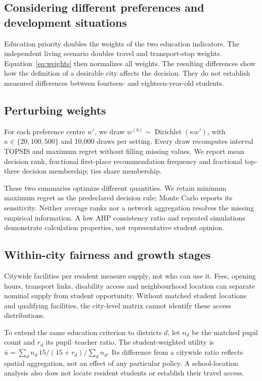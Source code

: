 \subsection{Considering different preferences and development situations}
Education priority doubles the weights of the two education indicators.
The independent living scenario doubles travel and transport-stop weights.
Equation~\ref{eq:weights} then normalizes all weights.
\PreferenceResults
\PreferenceEvidenceChange
The resulting differences show how the definition of a desirable city affects
the decision. They do not establish measured differences between fourteen- and
eighteen-year-old students.

\subsection{Perturbing weights}
For each preference centre $w'$, we draw
$w^{(b)}\sim\operatorname{Dirichlet}(\kappa w')$, with
$\kappa\in\{20,100,500\}$ and 10,000 draws per setting. Every draw recomputes
interval TOPSIS and maximum regret without filling missing values. We report
mean decision rank, fractional first-place recommendation frequency and
fractional top-three decision membership; ties share membership.





\MonteCarloInterpretation
These two summaries optimize different quantities. We retain minimum maximum
regret as the predeclared decision rule; Monte Carlo reports its sensitivity.
Neither average ranks nor a network aggregation resolves the missing empirical
information. A low AHP consistency ratio and repeated simulations demonstrate
calculation properties, not representative student opinion.

\subsection{Within-city fairness and growth stages}
Citywide facilities per resident measure supply, not who can use it. Fees,
opening hours, transport links, disability access and neighbourhood location
can separate nominal supply from student opportunity. Without matched student
locations and qualifying facilities, the city-level matrix cannot identify
these access distributions.

\EquityCase
To extend the same education criterion to districts $d$, let $n_d$ be the
matched pupil count and $r_d$ its pupil--teacher ratio. The student-weighted
utility is $\bar u=\sum_d n_d\,15/(15+r_d)/\sum_dn_d$.
Its difference from a citywide ratio reflects spatial aggregation, not an
effect of any particular policy. A school-location analysis also does not locate
resident students or establish their travel access.

